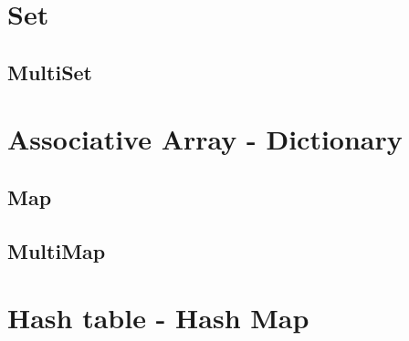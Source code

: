 
\chapter{Set}
\section{MultiSet}

\chapter{Associative Array - Dictionary}
\section{Map}
\section{MultiMap}
\chapter{Hash table - Hash Map}
	
\iffalse
http://www.tommyds.it/doc/benchmark.html
\fi